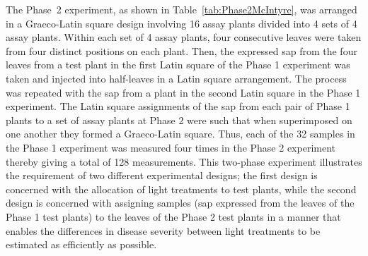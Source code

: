 The Phase~2 experiment, as shown in Table~\ref{tab:Phase2McIntyre}, was arranged in a Graeco-Latin square design involving 16 assay plants divided into 4 sets of 4 assay plants. Within each set of 4 assay plants, four consecutive leaves were taken from four distinct positions on each plant. Then, the expressed sap from the four leaves from a test plant in the first Latin square of the Phase 1 experiment was taken and injected into half-leaves in a Latin square arrangement. The process was repeated with the sap from a plant in the second Latin square in the Phase 1 experiment. The Latin square assignments of the sap from each pair of Phase 1 plants to a set of assay plants at Phase 2 were such that when superimposed on one another they formed a Graeco-Latin square. Thus, each of the 32 samples in the Phase 1 experiment was measured four times in the Phase 2 experiment thereby giving a total of 128 measurements. This two-phase experiment illustrates the requirement of two different experimental designs; the first design is concerned with the allocation of light treatments to test plants, while the second design is concerned with assigning samples (sap expressed from the leaves of the Phase 1 test plants) to the leaves of the Phase 2 test plants in a manner that enables the differences in disease severity between light treatments to be estimated as efficiently as possible.
  
